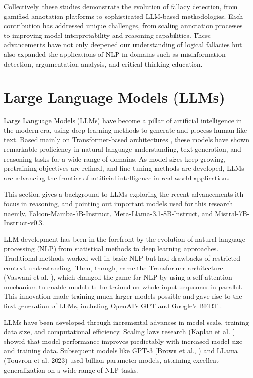 Collectively, these studies demonstrate the evolution of fallacy detection, from gamified annotation platforms to sophisticated LLM-based methodologies.
Each contribution has addressed unique challenges, from scaling annotation processes to improving model interpretability and reasoning capabilities.
These advancements have not only deepened our understanding of logical fallacies but also expanded the applications of NLP in domains such as misinformation detection, argumentation analysis, and critical thinking education.

\section{Large Language Models (LLMs)}
Large Language Models (LLMs) have become a pillar of artificial intelligence in the modern era, using deep learning methods to generate and process human-like text. Based mainly on Transformer-based architectures \cite{vaswani2017attention}, these models have shown remarkable proficiency in natural language understanding, text generation, and reasoning tasks for a wide range of domains. As model sizes keep growing, pretraining objectives are refined, and fine-tuning methods are developed, LLMs are advancing the frontier of artificial intelligence in real-world applications.

This section gives a background to LLMs exploring the recent advancements ith focus in reasoning, and pointing out important models used for this research naemly, Falcon-Mamba-7B-Instruct, Meta-Llama-3.1-8B-Instruct, and Mistral-7B-Instruct-v0.3. 

LLM development has been in the forefront by the evolution of natural language processing (NLP) from statistical methods to deep learning approaches. Traditional methods worked well in basic NLP but had drawbacks of restricted context understanding. 
Then, though, came the Transformer architecture (Vaswani et al. \cite{vaswani2017attention}), which changed the game for NLP by using a self-attention mechanism to enable models to be trained on whole input sequences in parallel. This innovation made training much larger models possible and gave rise to the first generation of LLMs, including OpenAI's GPT \cite{radford2018improving} and Google's BERT \cite{kenton2019bert}.

LLMs have been developed through incremental advances in model scale, training data size, and computational efficiency.
Scaling laws research (Kaplan et al. \cite{kaplan2020scaling}) showed that model performance improves predictably with increased model size and training data. Subsequent models like GPT-3 (Brown et al., \cite{brown2020language}) and LLama (Touvron et al. \cite{touvron2023llama} 2023) used billion-parameter models, attaining excellent generalization on a wide range of NLP tasks.

